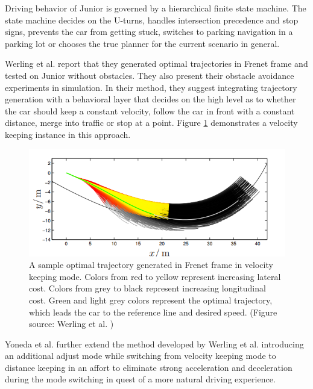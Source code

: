 Driving behavior of Junior is governed by a hierarchical finite state machine.
The state machine decides on the U-turns, handles intersection precedence and
stop signs, prevents the car from getting stuck, switches to parking navigation
in a parking lot or chooses the true planner for the current scenario in
general.

Werling et al. \cite{Werling2010OptimalTG} report that they generated optimal
trajectories in Frenet frame and tested on Junior without obstacles. They
also present their obstacle avoidance experiments in simulation. In their
method, they suggest integrating trajectory generation with a behavioral layer
that decides on the high level as to whether the car should keep a constant
velocity, follow the car in front with a constant distance, merge into
traffic or stop at a point. Figure \ref{figure:frenet-velocity-keeping}
demonstrates a velocity keeping instance in this approach.

\begin{figure}[h]
  \centering
  \includegraphics[width=.8\textwidth]{figures/frenet-velocity-keeping.png}
  \caption[A sample optimal trajectory generated in Frenet frame]{A sample
    optimal trajectory generated in Frenet frame in velocity keeping mode.
    Colors from red to yellow represent increasing lateral cost. Colors from
    grey to black represent increasing longitudinal cost. Green and light grey
    colors represent the optimal trajectory, which leads the car to the
    reference line and desired speed. (Figure source: Werling et al.
    \cite{Werling2010OptimalTG})}
  \label{figure:frenet-velocity-keeping}
\end{figure}

Yoneda et al. \cite{Yoneda2018TrajectoryOA} further extend the method developed
by Werling et al. \cite{Werling2010OptimalTG} introducing an additional adjust
mode while switching from velocity keeping mode to distance keeping in an
affort to eliminate strong acceleration and deceleration during the mode
switching in quest of a more natural driving experience.

